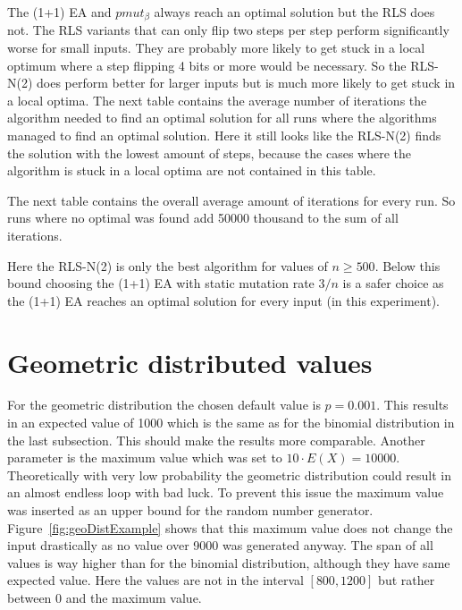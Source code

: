 

The (1+1) EA and $pmut_\beta$ always reach an optimal solution but the RLS does not.
The RLS variants that can only flip two steps per step perform significantly worse for small inputs.
They are probably more likely to get stuck in a local optimum where a step flipping 4 bits or more would be necessary.
So the RLS-N(2) does perform better for larger inputs but is much more likely to get stuck in a local optima.
The next table contains the average number of iterations the algorithm needed to find an optimal solution for all runs where the algorithms managed to find an optimal solution.
Here it still looks like the RLS-N(2) finds the solution with the lowest amount of steps, because the cases where the algorithm is stuck in a local optima are not contained in this table.



The next table contains the overall average amount of iterations for every run.
So runs where no optimal was found add 50000 thousand to the sum of all iterations.



Here the RLS-N(2) is only the best algorithm for values of $n \ge 500$.
Below this bound choosing the (1+1) EA with static mutation rate $3/n$ is a safer choice as the (1+1) EA reaches an optimal solution for every input (in this experiment).
\section{Geometric distributed values}
For the geometric distribution the chosen default value is $p=0.001$.
This results in an expected value of 1000 which is the same as for the binomial distribution in the last subsection.
This should make the results more comparable.
Another parameter is the maximum value which was set to $10 \cdot E(X)=10000$.
Theoretically with very low probability the geometric distribution could result in an almost endless loop with bad luck.
To prevent this issue the maximum value was inserted as an upper bound for the random number generator. 
Figure~\ref{fig:geoDistExample} shows that this maximum value does not change the input drastically as no value over 9000 was generated anyway.
The span of all values is way higher than for the binomial distribution, although they have same expected value.
Here the values are not in the interval $[800,1200]$ but rather between 0 and the maximum value. 

